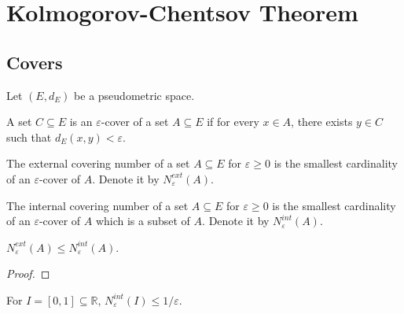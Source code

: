 \chapter{Kolmogorov-Chentsov Theorem}
\label{chap:kolmogorov_chentsov}

\section{Covers}

Let $(E, d_E)$ be a pseudometric space.

\begin{definition}\label{def:IsCover}
  \leanok
  A set $C \subseteq E$ is an $\varepsilon$-cover of a set $A \subseteq E$ if for every $x \in A$, there exists $y \in C$ such that $d_E(x, y) < \varepsilon$.
\end{definition}


\begin{definition}\label{def:externalCoveringNumber}
  \leanok
  The external covering number of a set $A \subseteq E$ for $\varepsilon \ge 0$ is the smallest cardinality of an $\varepsilon$-cover of $A$.
  Denote it by $N^{ext}_\varepsilon(A)$.
\end{definition}


\begin{definition}\label{def:internalCoveringNumber}
  \leanok
  The internal covering number of a set $A \subseteq E$ for $\varepsilon \ge 0$ is the smallest cardinality of an $\varepsilon$-cover of $A$ which is a subset of $A$.
  Denote it by $N^{int}_\varepsilon(A)$.
\end{definition}


\begin{lemma}\label{lem:externalCoveringNumber_le_internalCoveringNumber}
  \leanok
$N^{ext}_\varepsilon(A) \le N^{int}_\varepsilon(A)$.
\end{lemma}

\begin{proof}\leanok

\end{proof}


\begin{lemma}\label{lem:internalCoveringNumber_unitInterval}
For $I = [0, 1] \subseteq \mathbb{R}$, $N^{int}_\varepsilon(I) \le 1/\varepsilon$.
\end{lemma}

